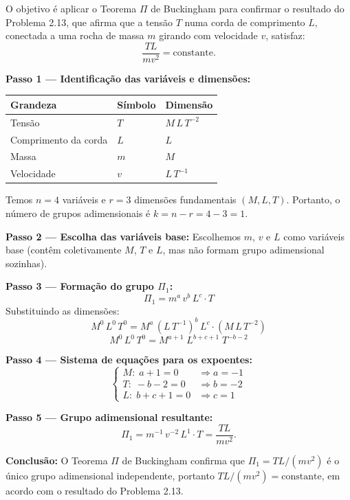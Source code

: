 O objetivo é aplicar o Teorema $\Pi$ de Buckingham para confirmar o resultado do Problema 2.13, que afirma que a tensão $T$ numa corda de comprimento $L$, conectada a uma rocha de massa $m$ girando com velocidade $v$, satisfaz:
\[
\frac{TL}{mv^2} = \text{constante.}
\]

\textbf{Passo 1 — Identificação das variáveis e dimensões:}
\begin{table}[h]
\centering
\begin{tabular}{lll}
\toprule
\textbf{Grandeza} & \textbf{Símbolo} & \textbf{Dimensão} \\
\midrule
Tensão & $T$ & $M\,L\,T^{-2}$ \\
Comprimento da corda & $L$ & $L$ \\
Massa & $m$ & $M$ \\
Velocidade & $v$ & $L\,T^{-1}$ \\
\bottomrule
\end{tabular}
\end{table}

Temos $n = 4$ variáveis e $r = 3$ dimensões fundamentais $(M, L, T)$. Portanto, o número de grupos adimensionais é $k = n - r = 4 - 3 = 1$.

\textbf{Passo 2 — Escolha das variáveis base:}
Escolhemos $m$, $v$ e $L$ como variáveis base (contêm coletivamente $M$, $T$ e $L$, mas não formam grupo adimensional sozinhas).

\textbf{Passo 3 — Formação do grupo $\Pi_1$:}
\[
\Pi_1 = m^{a}\,v^{b}\,L^{c}\cdot T
\]
Substituindo as dimensões:
\[
M^0\,L^0\,T^0 = M^{a}\,(L\,T^{-1})^{b}\,L^{c}\cdot (M\,L\,T^{-2})
\]
\[
M^0\,L^0\,T^0 = M^{a+1}\;L^{b+c+1}\;T^{-b-2}
\]

\textbf{Passo 4 — Sistema de equações para os expoentes:}
\[
\begin{cases}
M:\; a + 1 = 0 &\Rightarrow a = -1 \\
T:\; -b - 2 = 0 &\Rightarrow b = -2 \\
L:\; b + c + 1 = 0 &\Rightarrow c = 1
\end{cases}
\]

\textbf{Passo 5 — Grupo adimensional resultante:}
\[
\Pi_1 = m^{-1}\,v^{-2}\,L^{1}\cdot T = \frac{TL}{mv^2}.
\]

\textbf{Conclusão:} O Teorema $\Pi$ de Buckingham confirma que $\Pi_1 = TL/(mv^2)$ é o único grupo adimensional independente, portanto $TL/(mv^2) = \text{constante}$, em acordo com o resultado do Problema 2.13.